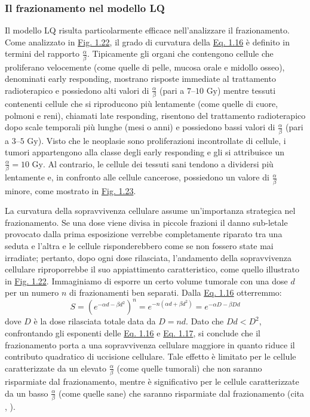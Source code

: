\documentclass[12pt,a4paper,twoside]{report}
\begin{document}
	\subsubsection{Il frazionamento nel modello LQ}
	Il modello LQ risulta particolarmente efficace nell'analizzare il frazionamento. Come analizzato in \hyperref[fig:survival_cell]{Fig. 1.22}, il grado di curvatura della \hyperref[eq:survival2]{Eq. 1.16} è definito in termini del rapporto $\frac{\alpha}{\beta}$. Tipicamente gli organi che contengono cellule che proliferano velocemente (come quelle di pelle, mucosa orale e midollo osseo), denominati early responding, mostrano risposte immediate al trattamento radioterapico e possiedono alti valori di $\frac{\alpha}{\beta}$ (pari a $7$--$10\mbox{ Gy}$) mentre tessuti contenenti cellule che si riproducono più lentamente (come quelle di cuore, polmoni e reni), chiamati late responding, risentono del trattamento radioterapico dopo scale temporali più lunghe (mesi o anni) e possiedono bassi valori di $\frac{\alpha}{\beta}$ (pari a $3$--$5\mbox{ Gy}$). Visto che le neoplasie sono proliferazioni incontrollate di cellule, i tumori appartengono alla classe degli early responding e gli si attribuisce un $\frac{\alpha}{\beta}=10\mbox{ Gy}$. Al contrario, le cellule dei tessuti sani tendono a dividersi più lentamente e, in confronto alle cellule cancerose, possiedono un valore di $\frac{\alpha}{\beta}$ minore, come mostrato in \hyperref[fig:sparing]{Fig. 1.23}.
	
	La curvatura della sopravvivenza cellulare assume un'importanza strategica nel frazionamento. Se una dose viene divisa in piccole frazioni il danno sub-letale provocato dalla prima esposizione verrebbe completamente riparato tra una seduta e l'altra e le cellule risponderebbero come se non fossero state mai irradiate; pertanto, dopo ogni dose rilasciata, l'andamento della sopravvivenza cellulare riproporrebbe il suo appiattimento caratteristico, come quello illustrato in \hyperref[fig:survival_cell]{Fig. 1.22}. Immaginiamo di esporre un certo volume tumorale con una dose $d$ per un numero $n$ di frazionamenti ben separati. Dalla \hyperref[eq:survival2]{Eq. 1.16} otterremmo:
	\begin{equation}
		S=\left(e^{-\alpha d-\beta d^2}\right)^n=e^{-n\left(\alpha d+\beta d^2\right)}=e^{-\alpha D-\beta Dd}
		\label{eq:survival3}
	\end{equation}
	dove $D$ è la dose rilasciata totale data da $D=nd$. Dato che $Dd<D^2$, confrontando gli esponenti delle \hyperref[eq:survival2]{Eq. 1.16} e \hyperref[eq:survival3]{Eq. 1.17}, si conclude che il frazionamento porta a una sopravvivenza cellulare maggiore in quanto riduce il contributo quadratico di uccisione cellulare. Tale effetto è limitato per le cellule caratterizzate da un elevato $\frac{\alpha}{\beta}$ (come quelle tumorali) che non saranno risparmiate dal frazionamento, mentre è significativo per le cellule caratterizzate da un basso $\frac{\alpha}{\beta}$ (come quelle sane) che saranno risparmiate dal frazionamento (cita
	,
	).
	
\end{document}
